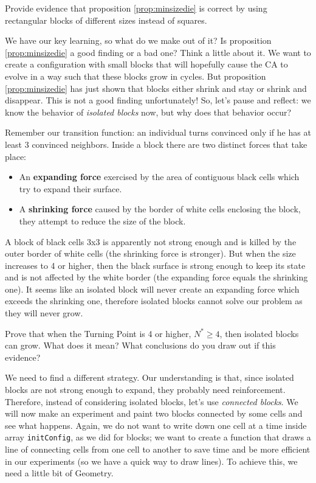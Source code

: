 \begin{problem}
\label{prob:blocksizedie}
Provide evidence that proposition \ref{prop:minsizedie} is correct by using rectangular blocks
of different sizes instead of squares.
\end{problem}

We have our key learning, so what do we make out of it? Is proposition \ref{prop:minsizedie} a good
finding or a bad one? Think a little about it. We want to create a configuration with small blocks
that will hopefully cause the CA to evolve in a way such that these blocks grow in cycles. But
proposition \ref{prop:minsizedie} has just shown that blocks either shrink and stay or shrink and
disappear. This is not a good finding unfortunately!
So, let's pause and reflect: we know the behavior of
\textit{isolated blocks} now, but why does that behavior occur?

Remember our transition function:
an individual turns convinced only if he has at least 3 convinced neighbors.
Inside a block there are two distinct forces that take place:

\begin{itemize}
\item An \textbf{expanding force} exercised by the area of contiguous black cells which
try to expand their surface.
\item A \textbf{shrinking force} caused by the border of white cells enclosing the block, they
attempt to reduce the size of the block.
\end{itemize}

A block of
black cells 3x3 is apparently not strong enough and is killed by the outer border of white cells
(the shrinking force is stronger).
But when the size increases to 4 or higher, then the black surface is strong enough to keep its state
and is not affected by the white border (the expanding force equals the shrinking one).
It seems like an isolated block will never create an expanding force which exceeds the shrinking one,
therefore isolated blocks cannot solve our problem as they will never grow.

\begin{problem}
\label{prob:highernblockslive}
Prove that when the Turning Point is 4 or higher, $N^\ast \geq 4$, then isolated blocks can grow.
What does it mean? What conclusions do you draw out if this evidence?
\end{problem}

We need to find a different strategy. Our understanding is that, since isolated blocks are not
strong enough to expand, they probably need reinforcement. Therefore, instead of considering isolated
blocks, let's use \textit{connected blocks}. We will now make an experiment and paint two blocks
connected by some cells and see what happens. Again, we do not want to write down one cell at a time
inside array \texttt{initConfig}, as we did for blocks;
we want to create a function that
draws a line of connecting cells from one cell to another to save time and be more efficient
in our experiments (so we have a quick way to draw lines). To achieve this, we need a little bit
of Geometry.\\

